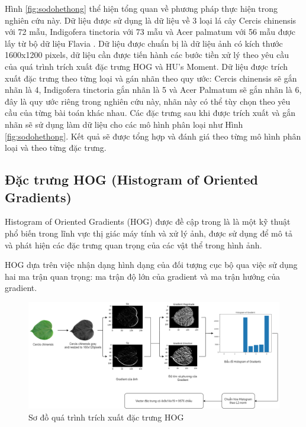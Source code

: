 \documentclass[a4paper]{article}
\begin{document}
Hình \ref{fig:sodohethong} thể hiện tổng quan về phương pháp thực hiện trong nghiên cứu này. Dữ liệu được sử dụng là dữ liệu về 3 loại lá cây Cercis chinensis với 72 mẫu, Indigofera tinctoria với 73 mẫu và Acer palmatum với 56 mẫu được lấy từ bộ dữ liệu Flavia \cite{wu2007leaf}. Dữ liệu được chuẩn bị là dữ liệu ảnh có kích thước 1600x1200 pixels, dữ liệu cần được tiến hành các bước tiền xử lý theo yêu cầu của quá trình trích xuất đặc trưng HOG và HU's Moment. Dữ liệu được trích xuất đặc trưng theo từng loại và gán nhãn theo quy ước: Cercis chinensis sẽ gắn nhãn là 4, Indigofera tinctoria gắn nhãn là 5 và Acer Palmatum sẽ gắn nhãn là 6, đây là quy ước riêng trong nghiên cứu này, nhãn này có thể tùy chọn theo yêu cầu của từng bài toán khác nhau. Các đặc trưng sau khi được trích xuất và gắn nhãn sẽ sử dụng làm dữ liệu cho các mô hình phân loại như Hình \ref{fig:sodohethong}. Kết quả sẽ được tổng hợp và đánh giá theo từng mô hình phân loại và theo từng đặc trưng.

\subsection{Đặc trưng HOG (Histogram of Oriented Gradients)} 
Histogram of Oriented Gradients (HOG) được đề cập trong \cite{hog2005} là là một kỹ thuật phổ biến trong lĩnh vực thị giác máy tính và xử lý ảnh, được sử dụng để mô tả và phát hiện các đặc trưng quan trọng của các vật thể trong hình ảnh.

HOG dựa trên việc nhận dạng hình dạng của đối tượng cục bộ qua việc sử dụng hai ma trận quan trọng: ma trận độ lớn của gradient và ma trận hướng của gradient.  
\begin{figure}
    \centering
    \includegraphics[width=1\linewidth]{images/sodohog.png}
    \caption{Sơ đồ quá trình trích xuất đặc trưng HOG}
    \label{fig:sodohog}
\end{figure}
\end{document}
